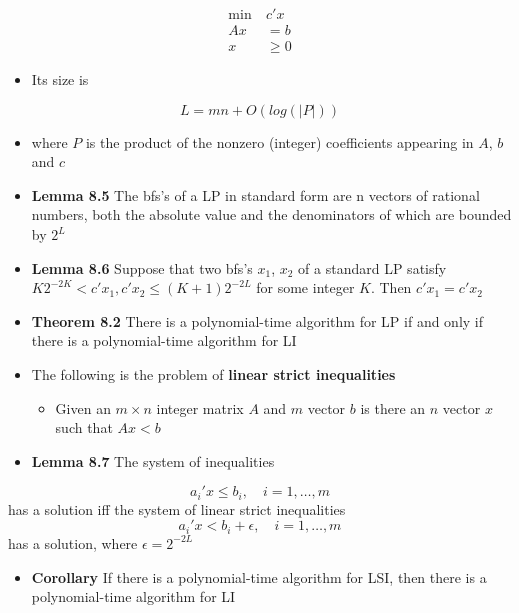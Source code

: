 \documentclass[11pt]{article}
\begin{document}
\begin{align*}
	\min \ & c'x \\
  Ax &= b \\
  x &\geq 0
\end{align*}	
\begin{itemize}
\item Its size is
\end{itemize}
\begin{equation}
  L = mn + O(log(|P|))
\end{equation}
\begin{itemize}
\item where \(P\) is the product of the nonzero (integer) coefficients appearing in \(A\), \(b\) and \(c\)
\item \textbf{Lemma 8.5} The bfs's of a LP in standard form are n vectors of rational numbers, both the absolute value and the denominators of which are bounded by \(2^L\)
\item \textbf{Lemma 8.6} Suppose that two bfs's \(x_1\), \(x_2\) of a standard LP satisfy \(K2^{-2K} < c'x_1,c'x_2 \leq (K+1)2^{-2L}\) for some integer \(K\). Then \(c'x_1 = c'x_2\)
\item \textbf{Theorem 8.2} There is a polynomial-time algorithm for LP if and only if there is a polynomial-time algorithm for LI

\item The following is the problem of \textbf{linear strict inequalities}
\begin{itemize}
\item Given an \(m \times n\) integer matrix \(A\) and \(m\) vector \(b\) is there an \(n\) vector \(x\) such that \(Ax < b\)
\end{itemize}

\item \textbf{Lemma 8.7} The system of inequalities
\end{itemize}
\begin{equation}
	a_i'x \leq b_i, \quad i=1,\dots,m  
\end{equation}
has a solution iff the system of linear strict inequalities
\begin{equation}
	a_i'x < b_i + \epsilon, \quad i=1,\dots,m  
\end{equation}	
has a solution, where \(\epsilon = 2^{-2L}\) 

\begin{itemize}
\item \textbf{Corollary} If there is a polynomial-time algorithm for LSI, then there is a polynomial-time algorithm for LI
\end{itemize}
\end{document}
